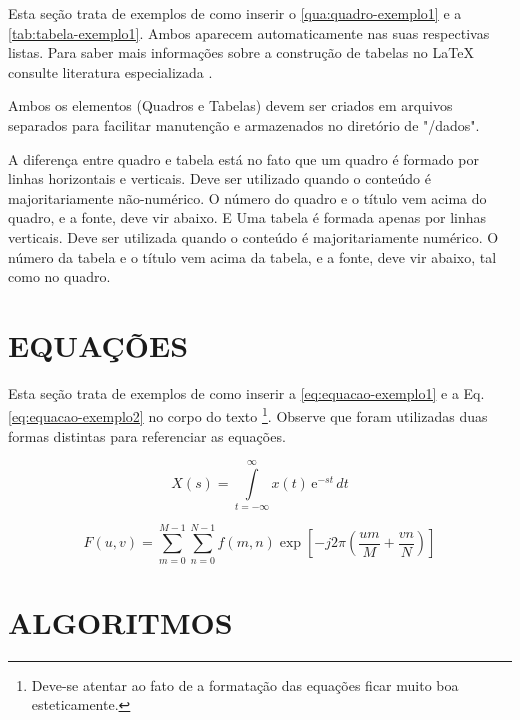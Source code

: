 Esta seção trata de exemplos de como inserir o \autoref{qua:quadro-exemplo1} e a \autoref{tab:tabela-exemplo1}. Ambos aparecem automaticamente nas suas respectivas listas. Para saber mais informações sobre a construção de tabelas no \LaTeX{} consulte literatura especializada \cite{Mittelbach2004}.

Ambos os elementos (Quadros e Tabelas) devem ser criados em arquivos separados para facilitar manutenção e armazenados no diretório de "/dados".

 

A diferença entre quadro e tabela está no fato que um quadro é formado por linhas horizontais e verticais. Deve ser utilizado quando o conteúdo é majoritariamente não-numérico. O número do quadro e o título vem acima do quadro, e a fonte, deve vir abaixo. E Uma tabela é formada apenas por linhas verticais. Deve ser utilizada quando o conteúdo é majoritariamente numérico. O número da tabela e o título vem acima da tabela, e a fonte, deve vir abaixo, tal como no quadro.



\section{EQUAÇÕES}
\label{sec:equacoes}

Esta seção trata de exemplos de como inserir a \autoref{eq:equacao-exemplo1} e a Eq. \ref{eq:equacao-exemplo2} no corpo do texto \footnote{Deve-se atentar ao fato de a formatação das equações ficar muito boa esteticamente.}. Observe que foram utilizadas duas formas distintas para referenciar as equações.

\begin{equation}
    X(s) = \int\limits_{t = -\infty}^{\infty} x(t) \, \text{e}^{-st} \, dt
    \label{eq:equacao-exemplo1}
\end{equation}

\begin{equation}
    F(u, v) = \sum_{m = 0}^{M - 1} \sum_{n = 0}^{N - 1} f(m, n) \exp \left[ -j 2 \pi \left( \frac{u m}{M} + \frac{v n}{N} \right) \right]
    \label{eq:equacao-exemplo2}
\end{equation}

\section{ALGORITMOS}
\label{sec:algoritmos}

